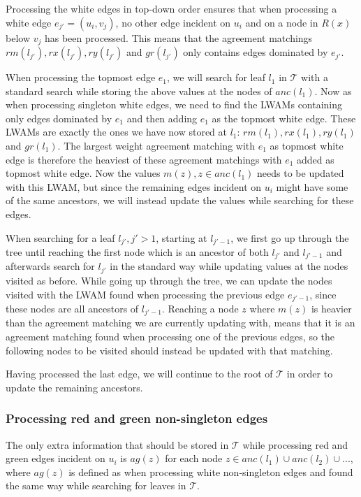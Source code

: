Processing the white edges in top-down order ensures that when processing a white edge $e_{j'}=(u_i,v_j)$, no other edge incident on $u_i$ and on a node in $R(x)$ below $v_j$ has been processed. This means that the agreement matchings $rm(l_{j'}), rx(l_{j'}), ry(l_{j'})$ and $gr(l_{j'})$ only contains edges dominated by $e_{j'}$.

When processing the topmost edge $e_1$, we will search for leaf $l_1$ in $\mathcal{T}$ with a standard search while storing the above values at the nodes of $anc(l_1)$. Now as when processing singleton white edges, we need to find the LWAMs containing only edges dominated by $e_1$ and then adding $e_1$ as the topmost white edge. These LWAMs are exactly the ones we have now stored at $l_1$: $rm(l_1), rx(l_1), ry(l_1)$ and $gr(l_1)$. The largest weight agreement matching with $e_1$ as topmost white edge is therefore the heaviest of these agreement matchings with $e_1$ added as topmost white edge. Now the values $m(z), z \in anc(l_1)$ needs to be updated with this LWAM, but since the remaining edges incident on $u_i$ might have some of the same ancestors, we will instead update the values while searching for these edges.

When searching for a leaf $l_{j'}, j' > 1$, starting at $l_{j'-1}$, we first go up through the tree until reaching the first node which is an ancestor of both $l_{j'}$ and $l_{j'-1}$ and afterwards search for $l_{j'}$ in the standard way while updating values at the nodes visited as before. While going up through the tree, we can update the nodes visited with the LWAM found when processing the previous edge $e_{j'-1}$, since these nodes are all ancestors of $l_{j'-1}$. Reaching a node $z$ where $m(z)$ is heavier than the agreement matching we are currently updating with, means that it is an agreement matching found when processing one of the previous edges, so the following nodes to be visited should instead be updated with that matching.

Having processed the last edge, we will continue to the root of $\mathcal{T}$ in order to update the remaining ancestors.

\subsubsection{Processing red and green non-singleton edges} 
The only extra information that should be stored in $\mathcal{T}$ while processing red and green edges incident on $u_i$ is $ag(z)$ for each node $z \in {anc(l_1) \cup anc(l_2) \cup ... }$, where $ag(z)$ is defined as when processing white non-singleton edges and found the same way while searching for leaves in $\mathcal{T}$.

